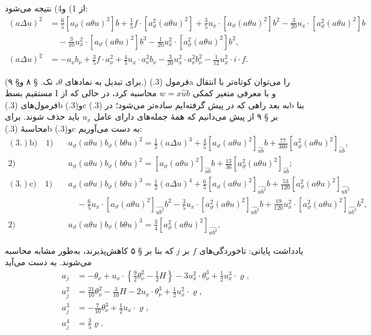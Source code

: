 \documentclass[11pt]{article}
\providecommand{\A}{\Delta}
\begin{document}
از 1) و4) نتیجه می‌شود:
\[
\begin{aligned}
(a\A u)^2
&=\frac65[a_\vartheta(a\theta u)^2]b+\frac15f\cdot[a_\vartheta^2(a\theta u)^2]+\frac35u_x\cdot[a_\vartheta(a\theta u)^2]b^2-\frac3{20}u_x\cdot[a_\vartheta^2(a\theta u)^2]b\\
&\quad-\frac3{10}u_x^2\cdot[a_\vartheta(a\theta u)^2]b^3-\frac1{20}u_x^2\cdot[a_\vartheta^2(a\theta u)^2]b^2,\\[0.4em]
(a\A u)^2&=-a_\nu b_\nu+\frac35f\cdot a_\nu^2+\frac45u_x\cdot a_\nu^2b_\nu-\frac3{20}u_x^2\cdot a_\nu^2b_\nu^2-\frac1{12}u_x^2\cdot i\cdot f.
\end{aligned}
\]

(برای تبدیل به نمادهای $\theta$، نک. § ۸ و§ ۹.)
فرمول (3.)a را می‌توان کوتاه‌تر با انتقال مستقیم بسط I و با معرفی متغیر کمکی $w=x\widehat{u}b$ محاسبه کرد، در حالی که از فرمول‌های (3.)b و(3.)c به بعد راهی که در پیش گرفته‌ایم ساده‌تر می‌شود؛ در (3.)b بنا بر § ۹ از پیش می‌دانیم که همهٔ جمله‌های دارای عامل $u_x$ باید حذف شوند. برای محاسبهٔ (3.)b و(3.)c به دست می‌آوریم:
\[
\begin{aligned}
(3.)\mathrm{b)}\quad 1)&\quad a_\vartheta(a\theta u)b_\vartheta(b\theta u)^2=\frac12(a\A u)^3+\frac45[a_\vartheta(a\theta u)^2]_{\widehat{ub}}b+\frac{77}{360}[a_\vartheta^2(a\theta u)^2]_{\widehat{ub}},\\
2)&\quad a_\vartheta(a\theta u)b_\vartheta(b\theta u)^2=[a_\vartheta(a\theta u)^2]_{\widehat{ub}}b+\frac{13}{36}[a_\vartheta^2(a\theta u)^2]_{\widehat{ub}};\\[0.5em]
(3.)\mathrm{c)}\quad 1)&\quad a_\vartheta(a\theta u)b_\vartheta(b\theta u)^3=\frac12(a\A u)^4+\frac65[a_\vartheta(a\theta u)^2]_{\widehat{ub^2}}b+\frac{53}{120}[a_\vartheta^2(a\theta u)^2]_{\widehat{ub^2}}\\
&\qquad-\frac65u_x\cdot[a_\vartheta(a\theta u)^2]_{\widehat{ub^2}}b^2-\frac35u_x\cdot[a_\vartheta^2(a\theta u)^2]_{\widehat{ub^2}}b+\frac{19}{120}u_x^2\cdot[a_\vartheta^2(a\theta u)^2]_{\widehat{ub^3}}b^2,\\
2)&\quad a_\vartheta(a\theta u)b_\vartheta(b\theta u)^3=\frac34[a_\vartheta^2(a\theta u)^2]_{\widehat{ub^2}}.
\end{aligned}
\]

یادداشت پایانی: تاخوردگی‌های $f$ بر $j$ که بنا بر § ۵ کاهش‌پذیرند، به‌طور مشابه محاسبه می‌شوند. به دست می‌آید
\[
\tag{4.}
\begin{aligned}
a_j&=-\theta_\nu+u_x\cdot\left\{\frac92\theta_\nu^2-\frac12H\right\}-3u_x^2\cdot\theta_\nu^3+\frac12u_x^3\cdot\varrho,\\
a_j^2&=\frac{21}{10}\theta_\nu^2-\frac3{10}H-2u_x\cdot\theta_\nu^3+\frac12u_x^2\cdot\varrho,\\
a_j^3&=-\frac7{10}\theta_\nu^3+\frac12u_x\cdot\varrho,\\
a_j^4&=\frac35\varrho.
\end{aligned}
\]
\end{document}

